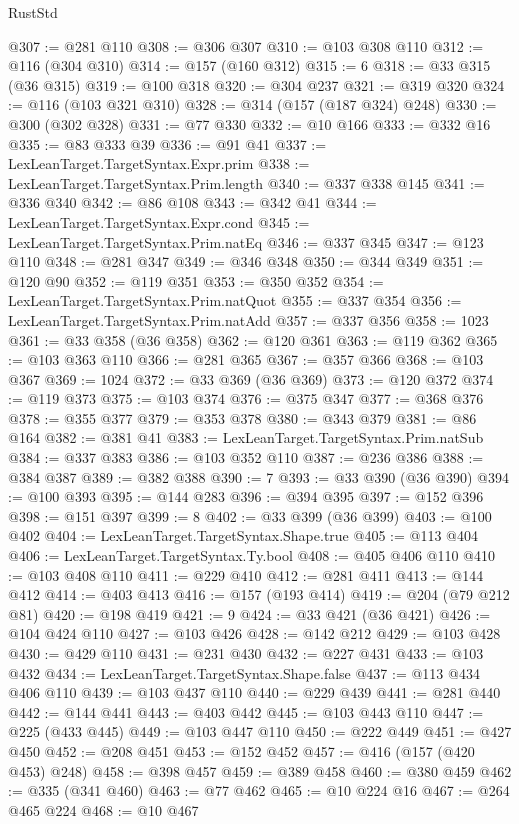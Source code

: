 \begin{lexlean}{RustStd}
\begin{coremodule}
@307 := @281 @110
@308 := @306 @307
@310 := @103 @308 @110
@312 := @116 (@304 @310)
@314 := @157 (@160 @312)
@315 := 6
@318 := @33 @315 (@36 @315)
@319 := @100 @318
@320 := @304 @237
@321 := @319 @320
@324 := @116 (@103 @321 @310)
@328 := @314 (@157 (@187 @324) @248)
@330 := @300 (@302 @328)
@331 := @77 @330
@332 := @10 @166
@333 := @332 @16
@335 := @83 @333 @39
@336 := @91 @41
@337 := LexLeanTarget.TargetSyntax.Expr.prim
@338 := LexLeanTarget.TargetSyntax.Prim.length
@340 := @337 @338 @145
@341 := @336 @340
@342 := @86 @108
@343 := @342 @41
@344 := LexLeanTarget.TargetSyntax.Expr.cond
@345 := LexLeanTarget.TargetSyntax.Prim.natEq
@346 := @337 @345
@347 := @123 @110
@348 := @281 @347
@349 := @346 @348
@350 := @344 @349
@351 := @120 @90
@352 := @119 @351
@353 := @350 @352
@354 := LexLeanTarget.TargetSyntax.Prim.natQuot
@355 := @337 @354
@356 := LexLeanTarget.TargetSyntax.Prim.natAdd
@357 := @337 @356
@358 := 1023
@361 := @33 @358 (@36 @358)
@362 := @120 @361
@363 := @119 @362
@365 := @103 @363 @110
@366 := @281 @365
@367 := @357 @366
@368 := @103 @367
@369 := 1024
@372 := @33 @369 (@36 @369)
@373 := @120 @372
@374 := @119 @373
@375 := @103 @374
@376 := @375 @347
@377 := @368 @376
@378 := @355 @377
@379 := @353 @378
@380 := @343 @379
@381 := @86 @164
@382 := @381 @41
@383 := LexLeanTarget.TargetSyntax.Prim.natSub
@384 := @337 @383
@386 := @103 @352 @110
@387 := @236 @386
@388 := @384 @387
@389 := @382 @388
@390 := 7
@393 := @33 @390 (@36 @390)
@394 := @100 @393
@395 := @144 @283
@396 := @394 @395
@397 := @152 @396
@398 := @151 @397
@399 := 8
@402 := @33 @399 (@36 @399)
@403 := @100 @402
@404 := LexLeanTarget.TargetSyntax.Shape.true
@405 := @113 @404
@406 := LexLeanTarget.TargetSyntax.Ty.bool
@408 := @405 @406 @110
@410 := @103 @408 @110
@411 := @229 @410
@412 := @281 @411
@413 := @144 @412
@414 := @403 @413
@416 := @157 (@193 @414)
@419 := @204 (@79 @212 @81)
@420 := @198 @419
@421 := 9
@424 := @33 @421 (@36 @421)
@426 := @104 @424 @110
@427 := @103 @426
@428 := @142 @212
@429 := @103 @428
@430 := @429 @110
@431 := @231 @430
@432 := @227 @431
@433 := @103 @432
@434 := LexLeanTarget.TargetSyntax.Shape.false
@437 := @113 @434 @406 @110
@439 := @103 @437 @110
@440 := @229 @439
@441 := @281 @440
@442 := @144 @441
@443 := @403 @442
@445 := @103 @443 @110
@447 := @225 (@433 @445)
@449 := @103 @447 @110
@450 := @222 @449
@451 := @427 @450
@452 := @208 @451
@453 := @152 @452
@457 := @416 (@157 (@420 @453) @248)
@458 := @398 @457
@459 := @389 @458
@460 := @380 @459
@462 := @335 (@341 @460)
@463 := @77 @462
@465 := @10 @224 @16
@467 := @264 @465 @224
@468 := @10 @467

\end{coremodule}
\end{lexlean}
